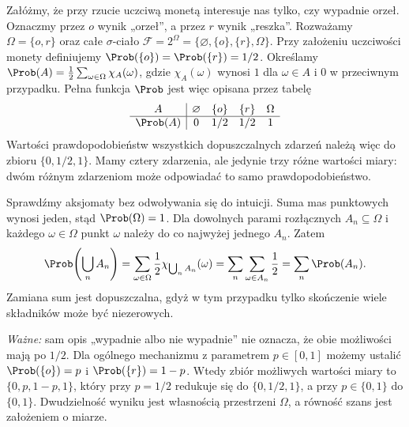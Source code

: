 \begin{przyklad}
Załóżmy, że przy rzucie uczciwą monetą interesuje nas tylko,
czy wypadnie orzeł. Oznaczmy przez $o$ wynik „orzeł”, a przez
$r$ wynik „reszka”. Rozważamy
$\Omega=\{o,r\}$ oraz całe $\sigma$-ciało
$\mathcal F=2^\Omega=\{\varnothing,\{o\},\{r\},\Omega\}$.
Przy założeniu uczciwości monety definiujemy
$\Prob(\{o\})=\Prob(\{r\})=1/2$.
Określamy $\Prob(A)=\frac12\sum_{\omega\in\Omega}\chi_A(\omega)$,
gdzie $\chi_A(\omega)$ wynosi $1$ dla $\omega\in A$ i $0$ w przeciwnym
przypadku. Pełna funkcja $\Prob$ jest więc opisana przez tabelę
\[
\begin{array}{c|cccc}
A&\varnothing&\{o\}&\{r\}&\Omega\\ \hline
\Prob(A)&0&1/2&1/2&1
\end{array}
\]
Wartości prawdopodobieństw wszystkich dopuszczalnych zdarzeń
należą więc do zbioru $\{0,1/2,1\}$. Mamy cztery zdarzenia,
ale jedynie trzy różne wartości miary: dwóm różnym zdarzeniom
może odpowiadać to samo prawdopodobieństwo.

Sprawdźmy aksjomaty bez odwoływania się do intuicji. Suma
mas punktowych wynosi jeden, stąd $\Prob(\Omega)=1$.
Dla dowolnych parami rozłącznych $A_n\subseteq\Omega$ i
każdego $\omega\in\Omega$ punkt $\omega$ należy do
co najwyżej jednego $A_n$. Zatem
\[
\Prob\!\left(\bigcup_n A_n\right)
=\sum_{\omega\in\Omega}\frac12\chi_{\bigcup_n A_n}(\omega)
=\sum_n\sum_{\omega\in A_n}\frac12
=\sum_n\Prob(A_n).
\]
Zamiana sum jest dopuszczalna, gdyż w tym przypadku tylko
skończenie wiele składników może być niezerowych.

\emph{Ważne:} sam opis „wypadnie albo nie wypadnie” nie oznacza,
że obie możliwości mają po $1/2$. Dla ogólnego
mechanizmu z parametrem $p\in[0,1]$ możemy ustalić
$\Prob(\{o\})=p$ i $\Prob(\{r\})=1-p$.
Wtedy zbiór możliwych wartości miary to
$\{0,p,1-p,1\}$, który przy $p=1/2$ redukuje się
do $\{0,1/2,1\}$, a przy $p\in\{0,1\}$ do $\{0,1\}$. Dwudzielność wyniku jest własnością
przestrzeni $\Omega$, a równość szans jest założeniem o miarze.
\end{przyklad}

